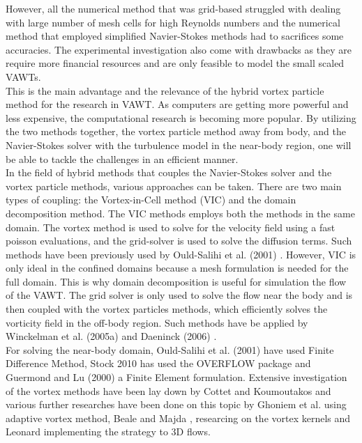 However, all the numerical method that was grid-based struggled with dealing with large number of mesh cells for high Reynolds numbers and the numerical method that employed simplified Navier-Stokes methods had to sacrifices some accuracies. The experimental investigation also come with drawbacks as they are require more financial resources and are only feasible to model the small scaled VAWTs.\\

This is the main advantage and the relevance of the hybrid vortex particle method for the research in VAWT. As computers are getting more powerful and less expensive, the computational research is becoming more popular. By utilizing the two methods together, the vortex particle method away from body, and the Navier-Stokes solver with the turbulence model in the near-body region, one will be able to tackle the challenges in an efficient manner.\\ 

In the field of hybrid methods that couples the Navier-Stokes solver and the vortex particle methods, various approaches can be taken. There are two main types of coupling: the Vortex-in-Cell method (VIC) and the domain decomposition method. The VIC methods employs both the methods in the same domain. The vortex method is used to solve for the velocity field using a fast poisson evaluations, and the grid-solver is used to solve the diffusion terms. Such methods have been previously used by Ould-Salihi et al. (2001) \cite{Ould-Salihi2001}. However, VIC is only ideal in the confined domains because a mesh formulation is needed for the full domain. This is why domain decomposition is useful for simulation the flow of the VAWT. The grid solver is only used to solve the flow near the body and is then coupled with the vortex particles methods, which efficiently solves the vorticity field in the off-body region. Such methods have be applied by Winckelman et al. (2005a) \cite{Winckelmans2005a} and Daeninck (2006) \cite{Daeninck2006}.\\ 

For solving the near-body domain, Ould-Salihi et al. (2001) \cite{Ould-Salihi2001} have used Finite Difference Method, Stock 2010 \cite{Stock} has used the OVERFLOW package and Guermond and Lu (2000) \cite{Guermond2000} a Finite Element formulation. Extensive investigation of the vortex methods have been lay down by Cottet and Koumoutakos \cite{Cottet2000a} and various further researches have been done on this topic by Ghoniem et al. \cite{Sethian1988} \cite{Lakkis2009} using adaptive vortex method, Beale and Majda \cite{Beale1985}, researcing on the vortex kernels and Leonard \cite{Couet1981} implementing the strategy to 3D flows.\\


